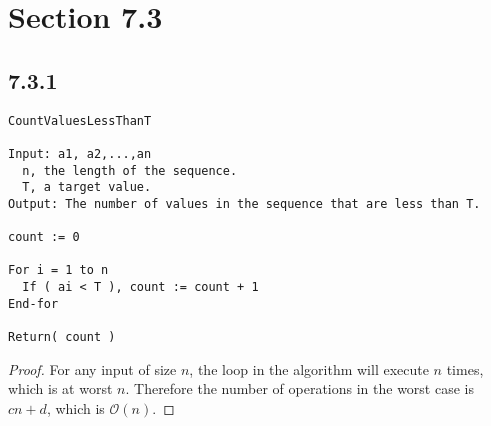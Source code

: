 





\section*{Section 7.3}

\subsection*{7.3.1}
\begin{lstlisting}
CountValuesLessThanT

Input: a1, a2,...,an
  n, the length of the sequence.
  T, a target value.
Output: The number of values in the sequence that are less than T.

count := 0

For i = 1 to n
  If ( ai < T ), count := count + 1
End-for

Return( count )
\end{lstlisting}
\begin{enumerate}
  \begin{proof}
    For any input of size $n$, the loop in the algorithm will execute $n$ times, which is at worst $n$. Therefore the number of operations in the worst case is $cn + d$, which is $\mathcal{O}(n)$.
  \end{proof}
\end{enumerate}

